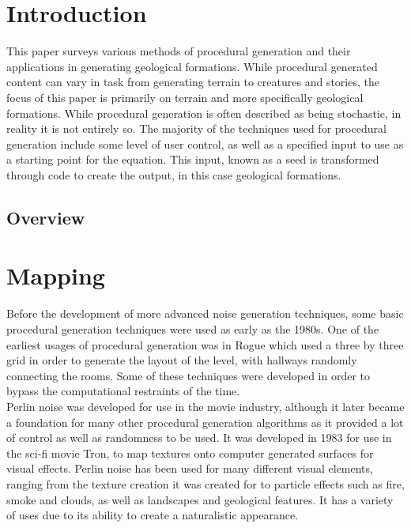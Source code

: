 \documentclass[12pt]{report}
\begin{document}
	\tableofcontents
	
	\clearpage
	
	\chapter{Introduction}
		This paper surveys various methods of procedural generation and their applications in generating geological formations. While procedural generated content can vary in task from generating terrain to creatures and stories, the focus of this paper is primarily on terrain and more specifically geological formations. While procedural generation is often described as being stochastic, in reality it is not entirely so. The majority of the techniques used for procedural generation include some level of user control, as well as a specified input to use as a starting point for the equation. This input, known as a seed is transformed through code to create the output, in this case geological formations. 
		
		\section{Overview}
		
	\chapter{Mapping}
		Before the development of more advanced noise generation techniques, some basic procedural generation techniques were used as early as the 1980s. One of the earliest usages of procedural generation was in Rogue
		which used a three by three grid in order to generate the layout of the level, with hallways randomly connecting the rooms. Some of these techniques were developed in order to bypass the computational restraints of the time. \\
		
		\noindent Perlin noise was developed for use in the movie industry, although it later became a foundation for many other procedural generation algorithms as it provided a lot of control as well as randomness to be used. It was developed in 1983 for use in the sci-fi movie Tron, to map textures onto computer generated surfaces for visual effects. Perlin noise has been used for many different visual elements, ranging from the texture creation it was created for to particle effects such as fire, smoke and clouds, as well as landscapes and geological features. It has a variety of uses due to its ability to create a naturalistic appearance. \\
		
\end{document}
